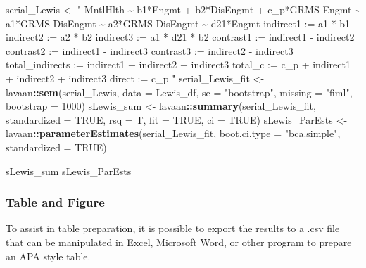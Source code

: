 \documentclass[
  11pt,
]{book}
\newenvironment{Shaded}{\begin{snugshade}}{\end{snugshade}}
\newcommand{\AttributeTok}[1]{\textcolor[rgb]{0.27,0.27,0.27}{#1}}
\newcommand{\ConstantTok}[1]{\textcolor[rgb]{0.37,0.37,0.37}{#1}}
\newcommand{\DecValTok}[1]{\textcolor[rgb]{0.06,0.06,0.06}{#1}}
\newcommand{\FunctionTok}[1]{\textcolor[rgb]{0.27,0.27,0.27}{\textbf{#1}}}
\newcommand{\NormalTok}[1]{#1}
\newcommand{\OtherTok}[1]{\textcolor[rgb]{0.37,0.37,0.37}{#1}}
\newcommand{\SpecialCharTok}[1]{\textcolor[rgb]{0.43,0.43,0.43}{\textbf{#1}}}
\newcommand{\StringTok}[1]{\textcolor[rgb]{0.5,0.5,0.5}{#1}}
\begin{document}
\begin{Shaded}
\begin{Highlighting}[]
\NormalTok{serial\_Lewis }\OtherTok{\textless{}{-}} \StringTok{"}
\StringTok{    MntlHlth \textasciitilde{} b1*Engmt + b2*DisEngmt + c\_p*GRMS}
\StringTok{    Engmt \textasciitilde{} a1*GRMS    }
\StringTok{    DisEngmt \textasciitilde{} a2*GRMS}
\StringTok{    DisEngmt \textasciitilde{} d21*Engmt}
\StringTok{    indirect1 := a1 * b1}
\StringTok{    indirect2 := a2 * b2}
\StringTok{    indirect3 := a1 * d21 * b2}
\StringTok{    contrast1 := indirect1 {-} indirect2}
\StringTok{    contrast2 := indirect1 {-} indirect3}
\StringTok{    contrast3 := indirect2 {-} indirect3}
\StringTok{    total\_indirects := indirect1 + indirect2 + indirect3}
\StringTok{    total\_c := c\_p + indirect1 + indirect2 + indirect3}
\StringTok{    direct := c\_p}
\StringTok{"}
\NormalTok{serial\_Lewis\_fit }\OtherTok{\textless{}{-}}\NormalTok{ lavaan}\SpecialCharTok{::}\FunctionTok{sem}\NormalTok{(serial\_Lewis, }\AttributeTok{data =}\NormalTok{ Lewis\_df, }\AttributeTok{se =} \StringTok{"bootstrap"}\NormalTok{,}
    \AttributeTok{missing =} \StringTok{"fiml"}\NormalTok{, }\AttributeTok{bootstrap =} \DecValTok{1000}\NormalTok{)}
\NormalTok{sLewis\_sum }\OtherTok{\textless{}{-}}\NormalTok{ lavaan}\SpecialCharTok{::}\FunctionTok{summary}\NormalTok{(serial\_Lewis\_fit, }\AttributeTok{standardized =} \ConstantTok{TRUE}\NormalTok{, }\AttributeTok{rsq =}\NormalTok{ T,}
    \AttributeTok{fit =} \ConstantTok{TRUE}\NormalTok{, }\AttributeTok{ci =} \ConstantTok{TRUE}\NormalTok{)}
\NormalTok{sLewis\_ParEsts }\OtherTok{\textless{}{-}}\NormalTok{ lavaan}\SpecialCharTok{::}\FunctionTok{parameterEstimates}\NormalTok{(serial\_Lewis\_fit, }\AttributeTok{boot.ci.type =} \StringTok{"bca.simple"}\NormalTok{,}
    \AttributeTok{standardized =} \ConstantTok{TRUE}\NormalTok{)}

\NormalTok{sLewis\_sum}
\NormalTok{sLewis\_ParEsts}
\end{Highlighting}
\end{Shaded}

\hypertarget{table-and-figure-1}{%
\subsubsection{Table and Figure}\label{table-and-figure-1}}

To assist in table preparation, it is possible to export the results to a .csv file that can be manipulated in Excel, Microsoft Word, or other program to prepare an APA style table.
\end{document}
